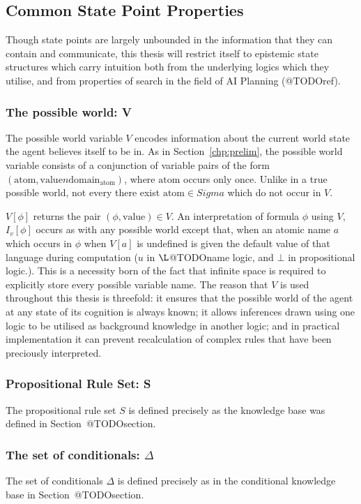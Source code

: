 \subsection{Common State Point Properties}
Though state points are largely unbounded in the information that they can contain and communicate, this thesis will restrict itself to epistemic state structures which carry intuition both from the underlying logics which they utilise, and from properties of search in the field of AI Planning (@TODOref).

\subsubsection*{The possible world: V}
The possible world variable $V$ encodes information about the current world state the agent believes itself to be in. As in Section~\ref{chp:prelim}, the possible world variable consists of a conjunction of variable pairs of the form $(\textrm{atom},\textrm{value}n\textrm{domain}_\textrm{atom})$, where $\textrm{atom}$ occurs only once. Unlike in a true possible world, not every there exist $\textrm{atom} \in Sigma$ which do not occur in $V$.

$V[\phi]$ returns the pair $(\phi,\textrm{value}) \in V$. An interpretation of formula $\phi$ using $V$, $I_v[\phi]$ occurs as with any possible world except that, when an atomic name $a$ which occurs in $\phi$ when $V[a]$ is undefined is given the default value of that language during computation ($u$ in $\L$@TODOname logic, and $\bot$ in propositional logic.). This is a necessity born of the fact that infinite space is required to explicitly store every possible variable name. The reason that $V$ is used throughout this thesis is threefold: it ensures that the possible world of the agent at any state of its cognition is always known; it allows inferences drawn using one logic to be utilised as background knowledge in another logic; and in practical implementation it can prevent recalculation of complex rules that have been preciously interpreted.

\subsubsection*{Propositional Rule Set: S}
The propositional rule set $S$ is defined precisely as the knowledge base was defined in Section~@TODOsection.

\subsubsection*{The set of conditionals: $\Delta$}
The set of conditionals $\Delta$ is defined precisely as in the conditional knowledge base in Section~@TODOsection.

